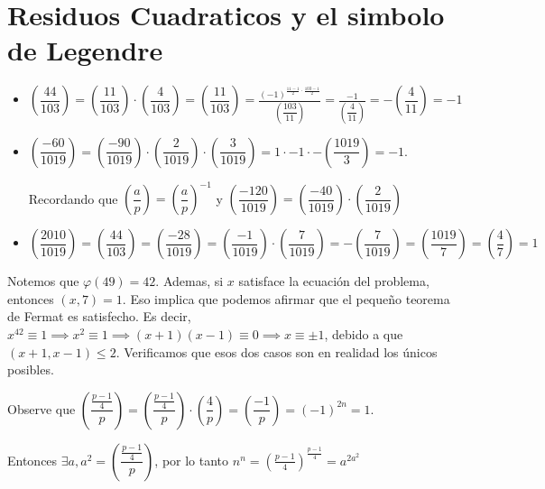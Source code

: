 \section{Residuos Cuadraticos y el simbolo de Legendre}

\begin{sol}
	\begin{itemize}
	\item $\left(\dfrac{44}{103}\right)= \left(\dfrac{11}{103}\right) \cdot \left(\dfrac{4}{103}\right) = \left(\dfrac{11}{103}\right) = \frac{(-1)^{\frac{11-1}{2} \cdot \frac{103-1}{2}}}{\left(\dfrac{103}{11}\right) } = \frac{-1}{\left(\dfrac{4}{11}\right)} = - \left(\dfrac{4}{11}\right) = -1$
	\item $\left(\dfrac{-60}{1019}\right) = \left(\dfrac{-90}{1019}\right) \cdot \left(\dfrac{2}{1019}\right) \cdot \left(\dfrac{3}{1019}\right) = 1 \cdot -1 \cdot -\left(\dfrac{1019}{3}\right) = -1.$
	
	Recordando que $\left(\dfrac{a}{p}\right) = \left(\dfrac{a}{p}\right)^{-1}$ y $\left(\dfrac{-120}{1019}\right) = \left(\dfrac{-40}{1019}\right) \cdot \left(\dfrac{2}{1019}\right)$
	
	\item $\left(\dfrac{2010}{1019}\right) = \left(\dfrac{44}{103}\right) = \left(\dfrac{-28}{1019}\right) = \left(\dfrac{-1}{1019}\right) \cdot \left(\dfrac{7}{1019}\right) = - \left(\dfrac{7}{1019}\right) = \left(\dfrac{1019}{7}\right) = \left(\dfrac{4}{7}\right) = 1$
	\end{itemize}
\end{sol}


\begin{sol}
	Notemos que $\varphi(49)  = 42$. Ademas, si $x$ satisface la ecuaci\'on del problema, entonces $(x, 7) = 1$. Eso implica que podemos afirmar que el pequeño teorema de Fermat es satisfecho. Es decir, $x^{42} \equiv 1 \implies x^2 \equiv 1 \implies (x+1)(x-1) \equiv 0  \implies x \equiv \pm 1$, debido a que $(x+1, x-1) \leq 2$. Verificamos que esos dos casos son en realidad los \'unicos posibles.
\end{sol}

\begin{sol}
	Observe que $\left(\dfrac{\frac{p-1}{4}}{p}\right) = \left(\dfrac{\frac{p-1}{4}}{p}\right) \cdot \left(\dfrac{4}{p}\right) = \left(\dfrac{-1}{p}\right) = (-1)^{2n} = 1$. 
	
	Entonces $\exists a, a^{2} = \left(\dfrac{\frac{p-1}{4}}{p}\right)$, por lo tanto $n^{n} = \left(\frac{p-1}{4}\right)^{\frac{p-1}{4}} = a^{2a^{2}} $
\end{sol}

